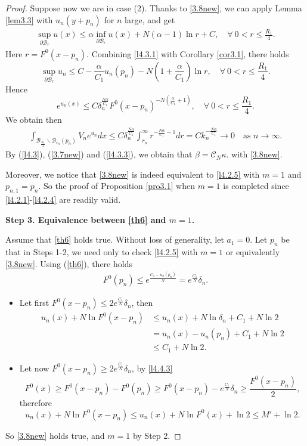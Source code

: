 \documentclass[11pt]{amsart}
\numberwithin{equation}{section}
\begin{document}
\begin{proof}
Suppose now we are in case (2). Thanks to \eqref{3.8new}, we can apply Lemma \ref{lem3.3} with $u_n(y+p_n)$ for $n$ large, and get
\begin{align}\label{l4.3.1}
\sup\limits_{\partial \mathcal{B}_r}u(x)\leq\alpha\inf\limits_{\partial \mathcal{B}_r}u(x)+N(\alpha-1)\ln r+C, \quad\forall~0 < r\leq\frac{R_{1}}{4}.
\end{align}
Here $r = F^0(x-p_n)$. Combining \eqref{l4.3.1} with Corollary \ref{cor3.1}, there holds
$$\sup\limits_{\partial \mathcal{B}_{r}}u_{n} \leq C -\frac{\alpha}{C_{1}}u_{n}(p_n)-N\left(1+\frac{\alpha}{C_{1}}\right)\ln r, \quad\forall~ 0 < r\leq\frac{R_{1}}{4}.$$
Hence
$$e^{u_{n}(x)}\leq C\delta_{n}^{\frac{N\alpha}{C_{1}}} F^{0}(x-p_n)^{-N\left(\frac{\alpha}{C_{1}}+1\right)},\quad\forall~ 0 < r\leq\frac{R_{1}}{4}.$$
We obtain then
\begin{align}\label{l4.3.3}
\int_{\mathcal{B}_{\frac{R_{1}}{4}}\backslash \mathcal{B}_{r_{n}}(p_n)}V_{n}e^{u_{n}}dx\leq C\delta_{n}^{\frac{N\alpha}{C_{1}}}\int_{r_{n}}^{\infty}r^{-\frac{N\alpha}{C_{1}}-1}dr=C k_n^{-\frac{N\alpha}{C_{1}}}\longrightarrow 0 \quad\mbox{as } n\rightarrow\infty.
\end{align}
By (\ref{l4.3}), (\ref{3.7new}) and (\ref{l4.3.3}), we obtain that $\beta = \mathcal{C}_{N}\kappa.$ with \eqref{3.8new}.

Moreover, we notice that \eqref{3.8new} is indeed equivalent to \eqref{l4.2.5} with $m = 1$ and $p_{n, 1} = p_n$. So the proof of Proposition \ref{pro3.1} when $m=1$ is completed since \eqref{l4.2.1}-\eqref{l4.2.4} are readily valid.

\medskip
\textbf{Step 3. Equivalence between \eqref{th6} and $m=1$.}

Assume that \eqref{th6} holds true. Without loss of generality, let $a_1 = 0$. Let $p_n$ be that in Steps 1-2, we need only to check \eqref{l4.2.5} with $m=1$ or equivalently \eqref{3.8new}. Using (\ref{th6}), there holds
\begin{align}\label{l4.4.3}
F^{0}(p_n)\leq e^{\frac{C_{1}-u_n(p_n)}{N}} = e^{\frac{C_{1}}{N}}\delta_{n}.
\end{align}
\begin{itemize}
\item[--] Let first $F^0(x - p_n) \le 2e^\frac{C_1}{N}\delta_n$, then
\begin{align*}
u_n(x) + N\ln F^0(x - p_n) &\leq u_n(x) + N\ln \delta_n + C_1 + N\ln 2\\
 & = u_n(x) - u_n(p_n) + C_1 + N\ln 2 \\
& \le C_1+ N\ln 2.
\end{align*}
\item[--] Let now $F^0(x - p_n) \ge 2e^\frac{C_1}{N}\delta_n$, by \eqref{l4.4.3}
$$F^0(x) \ge F^0(x - p_n) - F^0(p_n) \ge F^0(x - p_n) - e^\frac{C_1}{N}\delta_n \ge \frac{F^0(x - p_n)}{2},$$
therefore
$$u_n(x) + N\ln F^0(x - p_n) \le u_n(x) + N\ln F^0(x) + \ln 2 \le M'+\ln 2.$$
\end{itemize}
So \eqref{3.8new} holds true, and $m = 1$ by Step 2.


\end{proof}
\end{document}
